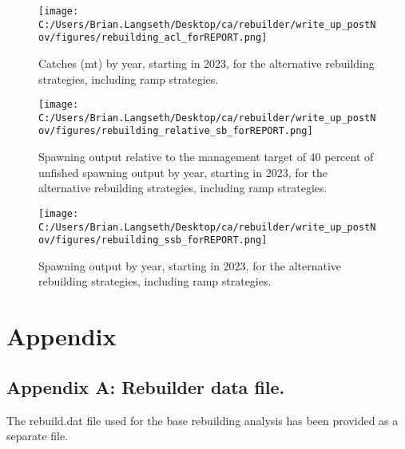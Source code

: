 \documentclass[11pt,
  english,
  letterpaper,
]{article}
\begin{document}
\begin{figure}
\centering
\texttt{[image: C:/Users/Brian.Langseth/Desktop/ca/rebuilder/write\_up\_postNov/figures/rebuilding\_acl\_forREPORT.png]}
\caption{Catches (mt) by year, starting in 2023, for the alternative rebuilding strategies, including ramp strategies.\label{fig:acl-fig}}
\end{figure}

\tagmcend\tagstructend


\begin{figure}
\centering
\texttt{[image: C:/Users/Brian.Langseth/Desktop/ca/rebuilder/write\_up\_postNov/figures/rebuilding\_relative\_sb\_forREPORT.png]}
\caption{Spawning output relative to the management target of 40 percent of unfished spawning output by year, starting in 2023, for the alternative rebuilding strategies, including ramp strategies.\label{fig:rel-ssb-fig}}
\end{figure}

\tagmcend\tagstructend


\begin{figure}
\centering
\texttt{[image: C:/Users/Brian.Langseth/Desktop/ca/rebuilder/write\_up\_postNov/figures/rebuilding\_ssb\_forREPORT.png]}
\caption{Spawning output by year, starting in 2023, for the alternative rebuilding strategies, including ramp strategies.\label{fig:ssb-fig}}
\end{figure}

\tagmcend\tagstructend

\clearpage

\clearpage


\hypertarget{appendix}{%
\section{Appendix}\label{appendix}}

\leavevmode\tagmcend\tagstructend


\hypertarget{append_a}{%
\subsection{Appendix A: Rebuilder data file.}\label{append_a}}

\leavevmode\tagmcend\tagstructend


The rebuild.dat file used for the base rebuilding analysis has been provided as a separate file.

\leavevmode\tagmcend\tagstructend\par

\clearpage
\end{document}
